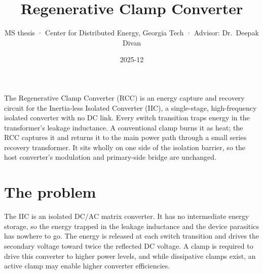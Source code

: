 \title{Regenerative Clamp Converter}
\subtitle{MS thesis · Center for Distributed Energy, Georgia Tech · Advisor: Dr.\ Deepak Divan}
\date{2025-12}




The Regenerative Clamp Converter (RCC) is an energy capture and recovery circuit
for the Inertia-less Isolated Converter (IIC), a single-stage, high-frequency
isolated converter with no DC link. Every switch transition traps energy in the
transformer's leakage inductance. A conventional clamp burns it as heat; the RCC
captures it and returns it to the main power path through a small series
recovery transformer. It sits wholly on one side of the isolation barrier, so
the host converter's modulation and primary-side bridge are unchanged.

\section{The problem}

The IIC is an isolated DC/AC matrix converter. It has no intermediate energy
storage, so the energy trapped in the leakage inductance and the device
parasitics has nowhere to go. The energy is released at each switch transition and drives the
secondary voltage toward twice the reflected DC voltage. A clamp is
required to drive this converter to higher power levels, and while
dissipative clamps exist, an active clamp may enable higher converter
efficiencies.


